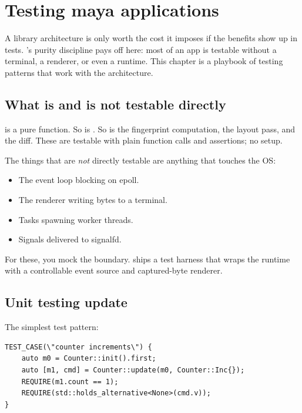 \chapter{Testing maya applications}
\label{ch:testing}

\begin{aside}
A library architecture is only worth the cost it imposes if the
benefits show up in tests. \maya{}'s purity discipline pays off
here: most of an app is testable without a terminal, a renderer,
or even a runtime. This chapter is a playbook of testing
patterns that work with the architecture.
\end{aside}

\section{What is and is not testable directly}

 is a pure function. So is . So is the
fingerprint computation, the layout pass, and the diff. These
are testable with plain function calls and assertions; no setup.

The things that are \emph{not} directly testable are anything
that touches the OS:

\begin{itemize}[leftmargin=*]
  \item The event loop blocking on epoll.
  \item The renderer writing bytes to a terminal.
  \item Tasks spawning worker threads.
  \item Signals delivered to signalfd.
\end{itemize}

For these, you mock the boundary. \maya{} ships a test harness
that wraps the runtime with a controllable event source and
captured-byte renderer.

\section{Unit testing update}

The simplest test pattern:

\begin{lstlisting}
TEST_CASE(\"counter increments\") {
    auto m0 = Counter::init().first;
    auto [m1, cmd] = Counter::update(m0, Counter::Inc{});
    REQUIRE(m1.count == 1);
    REQUIRE(std::holds_alternative<None>(cmd.v));
}
\end{lstlisting}

